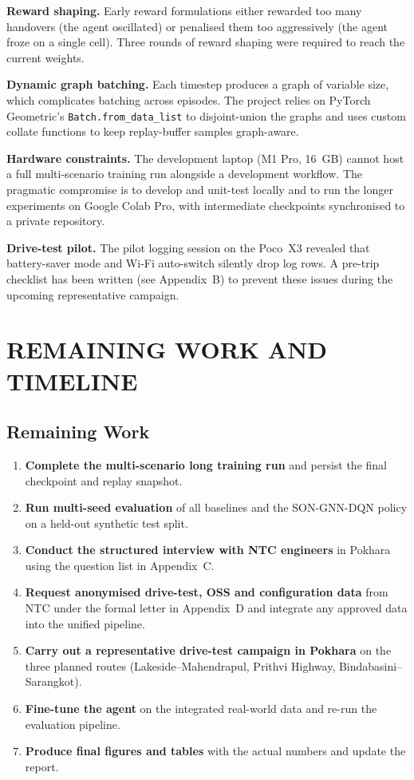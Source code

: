 \documentclass[12pt,a4paper,oneside]{report}
\begin{document}
\textbf{Reward shaping.} Early reward formulations either rewarded too
many handovers (the agent oscillated) or penalised them too aggressively
(the agent froze on a single cell). Three rounds of reward shaping
were required to reach the current weights.

\textbf{Dynamic graph batching.} Each timestep produces a graph of
variable size, which complicates batching across episodes. The project
relies on PyTorch Geometric's \texttt{Batch.from\_data\_list} to
disjoint-union the graphs and uses custom collate functions to keep
replay-buffer samples graph-aware.

\textbf{Hardware constraints.} The development laptop (M1 Pro, 16~GB)
cannot host a full multi-scenario training run alongside a development
workflow. The pragmatic compromise is to develop and unit-test locally
and to run the longer experiments on Google Colab Pro, with
intermediate checkpoints synchronised to a private repository.

\textbf{Drive-test pilot.} The pilot logging session on the Poco~X3
revealed that battery-saver mode and Wi-Fi auto-switch silently drop
log rows. A pre-trip checklist has been written (see Appendix~B) to
prevent these issues during the upcoming representative campaign.

\chapter{REMAINING WORK AND TIMELINE}

\section{Remaining Work}

\begin{enumerate}[leftmargin=*]
    \item \textbf{Complete the multi-scenario long training run} and
    persist the final checkpoint and replay snapshot.
    \item \textbf{Run multi-seed evaluation} of all baselines and the
    SON-GNN-DQN policy on a held-out synthetic test split.
    \item \textbf{Conduct the structured interview with NTC engineers}
    in Pokhara using the question list in Appendix~C.
    \item \textbf{Request anonymised drive-test, OSS and configuration
    data} from NTC under the formal letter in Appendix~D and integrate
    any approved data into the unified pipeline.
    \item \textbf{Carry out a representative drive-test campaign in
    Pokhara} on the three planned routes (Lakeside--Mahendrapul,
    Prithvi Highway, Bindabasini--Sarangkot).
    \item \textbf{Fine-tune the agent} on the integrated real-world
    data and re-run the evaluation pipeline.
    \item \textbf{Produce final figures and tables} with the actual
    numbers and update the report.
\end{enumerate}
\end{document}
